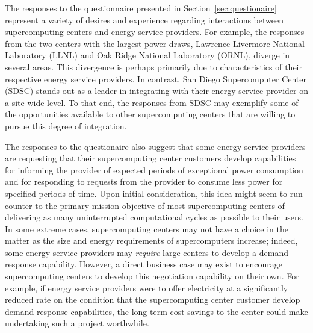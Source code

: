 The responses to the questionnaire presented in
Section~\ref{sec:questionaire} represent a variety of desires and
experience regarding interactions between supercomputing centers and
energy service providers.  For example, the responses from the two centers
with the largest power draws, Lawrence Livermore National Laboratory
(LLNL) and Oak Ridge National Laboratory (ORNL), diverge in several
areas.  This divergence is perhaps primarily due to characteristics of
their respective energy service providers.  In contrast, San Diego
Supercomputer Center (SDSC) stands out as a leader in integrating
with their energy service provider on a site-wide level.  To that end, the
responses from SDSC may exemplify some of the opportunities available
to other supercomputing centers that are willing to pursue this degree
of integration.

The responses to the questionaire also suggest that some energy service
providers are requesting that their supercomputing center customers
develop capabilities for informing the provider of expected periods of
exceptional power consumption and for responding to requests from the
provider to consume less power for specified periods of time.  Upon
initial consideration, this idea might seem to run counter to the
primary mission objective of most supercomputing centers of delivering
as many uninterrupted computational cycles as possible to their users.
In some extreme cases, supercomputing centers may not have a choice
in the matter as the size and energy requirements of supercomputers
increase; indeed, some energy service providers may \textit{require} large
centers to develop a demand-response capability.  However, a direct
business case may exist to encourage supercomputing centers to develop
this negotiation capability on their own.  For example, if energy service
providers were to offer electricity at a significantly reduced rate
on the condition that the supercomputing center customer develop
demand-response capabilities, the long-term cost savings to the
center could make undertaking such a project worthwhile.

